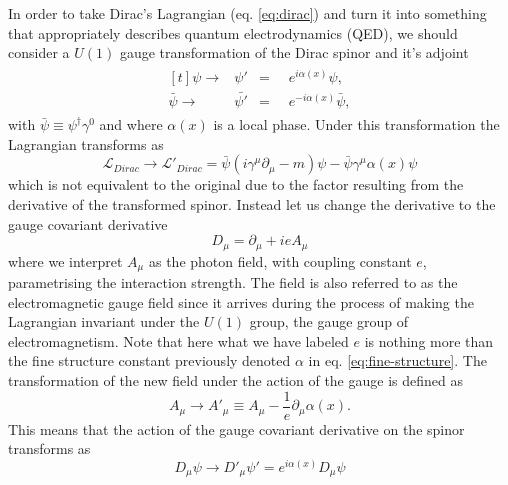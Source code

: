 In order to take Dirac's Lagrangian (eq. \ref{eq:dirac}) and turn it into
something that appropriately describes quantum electrodynamics (QED), we should
consider a $U(1)$ gauge transformation of the Dirac spinor and it's adjoint
\begin{equation}
  \label{eq:u1trans}
  \begin{split}
    \begin{aligned}[t]
      \psi \rightarrow &\psi' &=&\;\; e^{i\alpha(x)}\psi,\\
      \bar{\psi} \rightarrow &\bar{\psi'} &=&\;\; e^{-i\alpha(x)}\bar{\psi},
    \end{aligned}
  \end{split}
\end{equation}
with $\bar{\psi} \equiv \psi^{\dagger}\gamma^{0}$ and where $\alpha(x)$ is a
local phase. Under this transformation the Lagrangian transforms as
\begin{equation}
  \label{eq:diracu1}
  \mathcal{L}_{Dirac} \rightarrow \mathcal{L}'_{Dirac} =
  \bar{\psi}(i\gamma^{\mu}\partial_{\mu} - m)\psi -
  \bar{\psi}\gamma^{\mu}\alpha(x)\psi
\end{equation}
which is not equivalent to the original due to the factor resulting from the
derivative of the transformed spinor. Instead let us change the derivative to
the gauge covariant derivative
\begin{equation}
  \label{eq:covariant-em}
  D_\mu = \partial_{\mu} + ieA_{\mu}
\end{equation}
where we interpret $A_{\mu}$ as the photon field, with coupling constant $e$,
parametrising the interaction strength. The field is also referred to as the
electromagnetic gauge field since it arrives during the process of making the
Lagrangian invariant under the $U(1)$ group, the gauge group of
electromagnetism. Note that here what we have labeled $e$ is nothing more than
the fine structure constant previously denoted $\alpha$ in eq.
\ref{eq:fine-structure}. The transformation of the new field under the action of
the gauge is defined as
\begin{equation}
  \label{eq:em-field-gauge}
  A_{\mu} \rightarrow A'_{\mu} \equiv A_{\mu} - \frac{1}{e}\partial_{\mu}\alpha(x).
\end{equation}
This means that the action of the gauge covariant derivative on the spinor
transforms as
\begin{equation}
  \label{eq:cov-trans}
  D_{\mu}\psi \rightarrow D'_{\mu}\psi' = e^{i\alpha(x)}D_{\mu}\psi
\end{equation}
